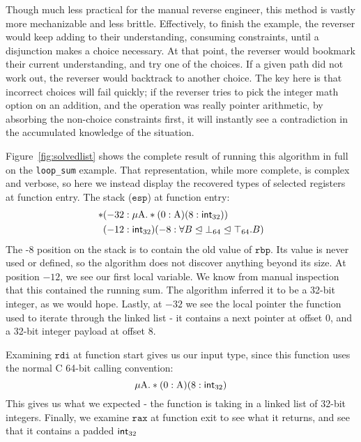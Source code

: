 Though much less practical for the manual reverse engineer, this method is vastly more mechanizable and less brittle. Effectively, to finish the example, the reverser would keep adding to their understanding, consuming constraints, until a disjunction makes a choice necessary. At that point, the reverser would bookmark their current understanding, and try one of the choices. If a given path did not work out, the reverser would backtrack to another choice. The key here is that incorrect choices will fail quickly; if the reverser tries to pick the integer math option on an addition, and the operation was really pointer arithmetic, by absorbing the non-choice constraints first, it will instantly see a contradiction in the accumulated knowledge of the situation.

Figure~\ref{fig:solvedlist} shows the complete result of running this algorithm in full on the \texttt{loop\_sum} example.
That representation, while more complete, is complex and verbose, so here we instead display the recovered types of selected registers at function entry. The stack ($\texttt{esp}$) at function entry:
\begin{align*}
*&(-32 : \mu \textrm{A}. *(0:\textrm{A})(8:\mathsf{int}_{32}))\\
&(-12 : \mathsf{int}_{32})(-8:\forall B\mathrel{\unlhd} \bot_{64}\mathrel{\unlhd} \top_{64}.B)
\end{align*}
The -8 position on the stack is to contain the old value of $\texttt{rbp}$. Its value is never used or defined, so the algorithm does not discover anything beyond its size. At position $-12$, we see our first local variable. We know from manual inspection that this contained the running sum.
The algorithm inferred it to be a 32-bit integer, as we would hope.
Lastly, at $-32$ we see the local pointer the function used to iterate through the linked list - it contains a next pointer at offset 0, and a 32-bit integer payload at offset 8.

Examining $\texttt{rdi}$ at function start gives us our input type, since this function uses the normal C 64-bit calling convention:
$$\mu \textrm{A}. *(0:\textrm{A})(8:\mathsf{int}_{32})$$
This gives us what we expected - the function is taking in a linked list of 32-bit integers. Finally, we examine $\texttt{rax}$ at function exit to see what it returns, and see that it contains a padded $\mathsf{int}_{32}$
